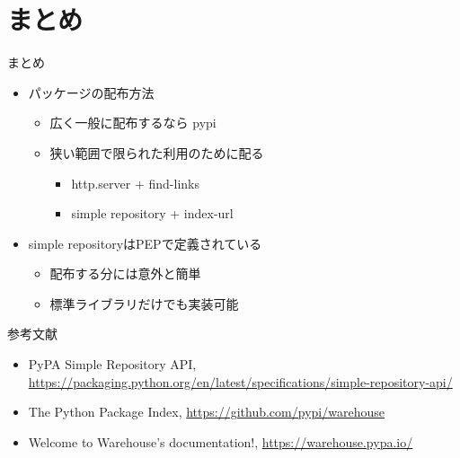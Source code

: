\documentclass[presentation]{beamer}
\begin{document}
\section{まとめ}
\label{sec:orgbd06fc9}
\begin{frame}[label={sec:orga308360}]{まとめ}
\begin{itemize}
\item パッケージの配布方法
\begin{itemize}
\item 広く一般に配布するなら pypi
\item 狭い範囲で限られた利用のために配る
\begin{itemize}
\item http.server + find-links
\item simple repository + index-url
\end{itemize}
\end{itemize}
\item simple repositoryはPEPで定義されている
\begin{itemize}
\item 配布する分には意外と簡単
\item 標準ライブラリだけでも実装可能
\end{itemize}
\end{itemize}
\end{frame}

\begin{frame}[label={sec:orgcc79ffb}]{参考文献}
\begin{itemize}
\item PyPA Simple Repository API, \url{https://packaging.python.org/en/latest/specifications/simple-repository-api/}
\item The Python Package Index, \url{https://github.com/pypi/warehouse}
\item Welcome to Warehouse's documentation!, \url{https://warehouse.pypa.io/}
\end{itemize}
\end{frame}
\end{document}
